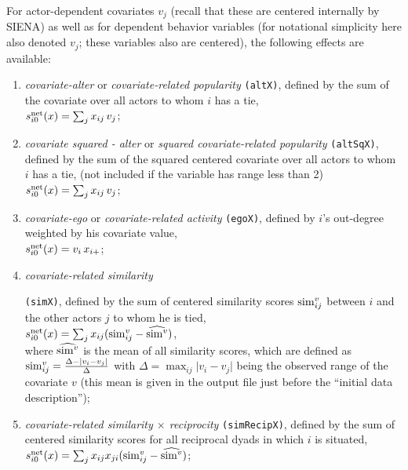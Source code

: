 \documentclass[a4paper,fleqn,11pt]{article}
\newcommand{\+}{\, + \,}
\newcommand{\vit}{\theenumi}
\newcommand{\si}{{\sf SIENA}}
\newcounter{savenumi}
\begin{document}
\noindent
For actor-dependent covariates $v_j$ (recall that these are
centered internally by \si) as well as for dependent behavior
variables (for notational simplicity here also denoted $v_j$;
these variables also are centered),
the following effects are available:
\begin{enumerate}
\setcounter{enumi}{\value{savenumi}}

 \item {\em covariate-alter} or {\em covariate-related popularity}
 \texttt{(altX)},
 defined by the sum of the covariate over all actors to whom $i$ has a tie,\\
 $s^{\rm net}_{i\vit}(x) = \sum_j x_{ij}\, v_j$;

 \item {\em covariate squared - alter} or {\em squared covariate-related popularity} \texttt{(altSqX)},
 defined by the sum of the squared centered covariate over all actors to whom $i$ has a tie,
 (not included if the variable has range less than 2)\\
 $s^{\rm net}_{i\vit}(x) = \sum_j x_{ij}\, v_j$;

 \item {\em covariate-ego} or {\em covariate-related activity}
 \texttt{(egoX)},
 defined by $i$'s out-degree weighted by his covariate value,\\
 $s^{\rm net}_{i\vit}(x) = v_i \, x_{i+} $;

 \item \hypertarget{T_simx}{{\em covariate-related similarity}} \texttt{(simX)},
 \label{simx}
 defined by the sum of centered similarity scores ${\rm sim}^v_{ij}$
 between $i$  and the other actors $j$ to whom he is tied,\\
 $s^{\rm net}_{i\vit}(x) = \sum_j x_{ij} ({\rm sim}^v_{ij} - \widehat{{\rm sim}^v}) $,\\
 where $\widehat{{\rm sim}^v}$ is the mean of all similarity scores, which are defined as
 ${\rm sim}^v_{ij}=\frac{\Delta-\vert v_i - v_j \vert}{\Delta}$ with
 $\Delta=\max_{ij}\vert v_i - v_j \vert$ being the observed range of the covariate $v$
 (this mean is given in the output file just before the
 ``initial data description'');

 \item {\em covariate-related similarity $\times$ reciprocity}
 \texttt{(simRecipX)}, defined by
 the sum of centered similarity scores for all
 reciprocal dyads in which $i$ is situated,\\
 $s^{\rm net}_{i\vit}(x) = \sum_j x_{ij}x_{ji} ({\rm sim}^v_{ij} - \widehat{{\rm sim}^v}) $;


\end{enumerate}
\end{document}
